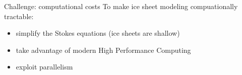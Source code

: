\documentclass[hide notes,intlimits]{beamer}
\begin{document}




\begin{frame}{Challenge: computational costs}
  To make ice sheet modeling compuationally tractable:
  \begin{itemize}
  \item simplify the Stokes equations (ice sheets are shallow)
  \item take advantage of modern High Performance Computing
  \item exploit parallelism
  \end{itemize}
\end{frame}
\end{document}
